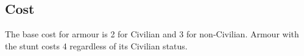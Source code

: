 \iflandscape{\vfil}{}

\subsection{Cost}
\label{sec:personal-armour-cost}

The base cost for armour is 2 for Civilian and 3 for non-Civilian.
Armour with the  stunt costs 4 regardless of its Civilian
status.

%

\vfil